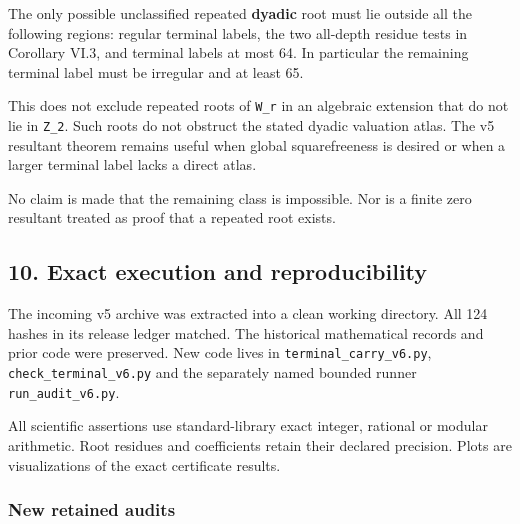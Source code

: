 \documentclass[11pt,letterpaper]{article}
\begin{document}
The only possible unclassified repeated \textbf{dyadic} root must lie outside all the following regions: regular terminal labels, the two all-depth residue tests in Corollary VI.3, and terminal labels at most 64. In particular the remaining terminal label must be irregular and at least 65.

This does not exclude repeated roots of \texttt{W\_r} in an algebraic extension that do not lie in \texttt{Z\_2}. Such roots do not obstruct the stated dyadic valuation atlas. The v5 resultant theorem remains useful when global squarefreeness is desired or when a larger terminal label lacks a direct atlas.

No claim is made that the remaining class is impossible. Nor is a finite zero resultant treated as proof that a repeated root exists.

\subsection{10. Exact execution and reproducibility}\label{exact-execution-and-reproducibility}

The incoming v5 archive was extracted into a clean working directory. All 124 hashes in its release ledger matched. The historical mathematical records and prior code were preserved. New code lives in \texttt{terminal\_carry\_v6.py}, \texttt{check\_terminal\_v6.py} and the separately named bounded runner \texttt{run\_audit\_v6.py}.

All scientific assertions use standard-library exact integer, rational or modular arithmetic. Root residues and coefficients retain their declared precision. Plots are visualizations of the exact certificate results.

\subsubsection{New retained audits}\label{new-retained-audits}
\end{document}
